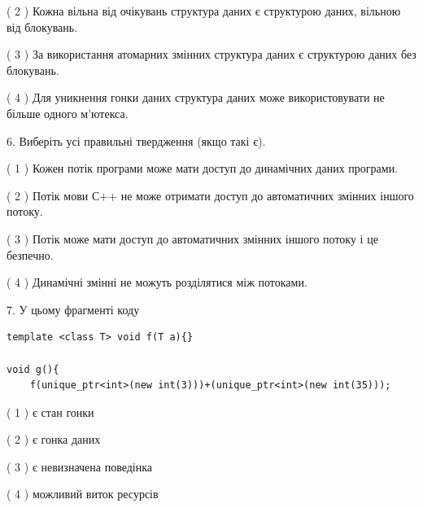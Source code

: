 \documentclass[12pt, ukrainian]{article}
\begin{document}
\begin {large}
{( 2 ) Кожна вільна від очікувань структура даних є структурою даних, вільною від блокувань.%

( 3 ) За використання атомарних змінних структура даних є структурою даних без блокувань.%

( 4 ) Для уникнення гонки даних структура даних може використовувати не більше одного м’ютекса.%
\newpage



\vspace{5mm}
6. Виберіть усі правильні твердження (якщо такі є).\par
\vspace{2mm}

( 1 ) Кожен потік програми може мати доступ до динамічних даних програми.%

( 2 ) Потік мови С++ не може отримати доступ до автоматичних змінних іншого потоку.%

( 3 ) Потік може мати доступ до автоматичних змінних іншого потоку і це безпечно.%

( 4 ) Динамічні змінні не можуть розділятися між потоками.%


\vspace{5mm}
7. У цьому фрагменті коду
\begin{verbatim}
template <class T> void f(T a){}

void g(){
    f(unique_ptr<int>(new int(3)))+(unique_ptr<int>(new int(35)));
\end{verbatim}

( 1 ) є стан гонки%

( 2 ) є гонка даних%

( 3 ) є невизначена поведінка%

( 4 ) можливий виток ресурсів%
}
\end {large}
\end{document}

